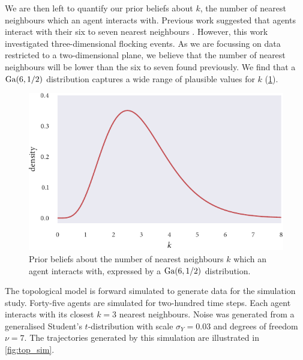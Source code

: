We are then left to quantify our prior beliefs about $k$, the number of nearest neighbours
which an agent interacts with. Previous work suggested that agents interact with their six
to seven nearest neighbours \parencite{ballerini08}. However, this work investigated
three-dimensional flocking events. As we are focussing on data restricted to a
two-dimensional plane, we believe that the number of nearest neighbours will be lower than
the six to seven found previously. We find that a $\textrm{Ga}(6, 1/2)$ distribution captures a
wide range of plausible values for $k$ (\cref{fig:top_priors}).

\begin{figure}[tbp]
  \includegraphics{top_priors.pdf}
  \caption{Prior beliefs about the number of nearest neighbours $k$ which an agent
    interacts with, expressed by a $\textrm{Ga}(6, 1/2)$ distribution.}
  \label{fig:top_priors}
\end{figure}

The topological model is forward simulated to generate data for the simulation study.
Forty-five agents are simulated for two-hundred time steps. Each agent interacts with its
closest $k=3$ nearest neighbours. Noise was generated from a generalised Student's
$t$-distribution with scale $\sigma_Y=0.03$ and degrees of freedom $\nu=7$. The
trajectories generated by this simulation are illustrated in \cref{fig:top_sim}.

